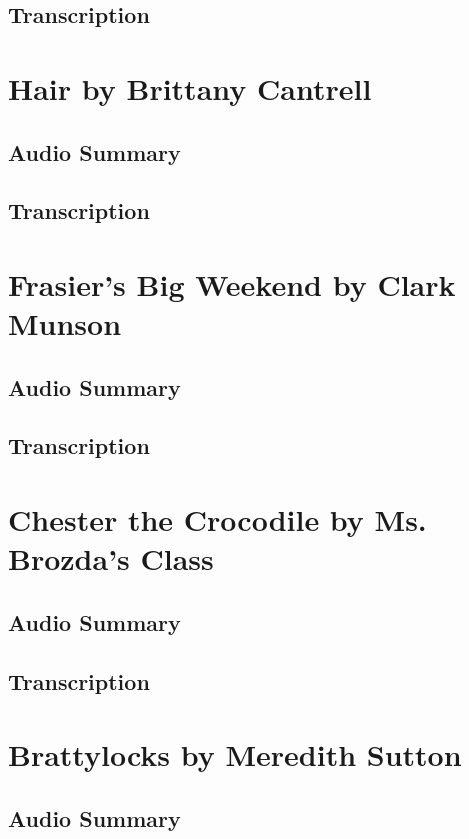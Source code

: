 \subsection{Transcription}

\section{Hair by Brittany Cantrell}

\subsection{Audio Summary}

\subsection{Transcription}

\section{Frasier's Big Weekend by Clark Munson}

\subsection{Audio Summary}

\subsection{Transcription}

\section{Chester the Crocodile by Ms. Brozda's Class}

\subsection{Audio Summary}

\subsection{Transcription}

\section{Brattylocks by Meredith Sutton}

\subsection{Audio Summary}

